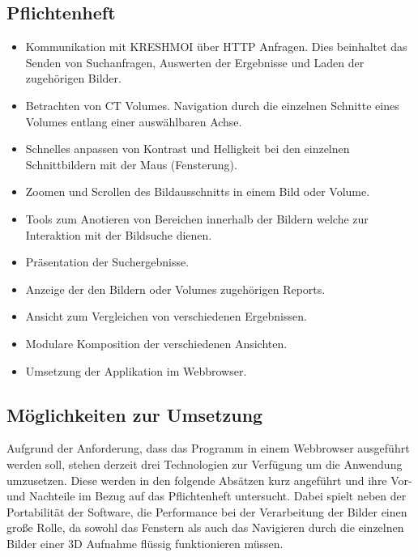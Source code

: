\subsection{Pflichtenheft}
\label{sec:Pflichtenheft}
\begin{itemize}
	\item Kommunikation mit KRESHMOI über HTTP Anfragen. Dies beinhaltet das Senden von Suchanfragen, Auswerten der Ergebnisse und Laden der zugehörigen Bilder.
	\item Betrachten von CT Volumes. Navigation durch die einzelnen Schnitte eines Volumes entlang einer auswählbaren Achse.
	\item Schnelles anpassen von Kontrast und Helligkeit bei den einzelnen Schnittbildern mit der Maus (Fensterung).
	\item Zoomen und Scrollen des Bildausschnitts in einem Bild oder Volume.
	\item Tools zum Anotieren von Bereichen innerhalb der Bildern welche zur Interaktion mit der Bildsuche dienen.
	\item Präsentation der Suchergebnisse.
	\item Anzeige der den Bildern oder Volumes zugehörigen Reports.
	\item Ansicht zum Vergleichen von verschiedenen Ergebnissen.
	\item Modulare Komposition der verschiedenen Ansichten.
	\item Umsetzung der Applikation im Webbrowser.
\end{itemize}

\subsection{Möglichkeiten zur Umsetzung}
\label{sec:Möglichkeiten zur Umsetzung}
Aufgrund der Anforderung, dass das Programm in einem Webbrowser ausgeführt werden soll, stehen derzeit drei Technologien zur Verfügung um die Anwendung umzusetzen.
Diese werden in den folgende Absätzen kurz angeführt und ihre Vor- und Nachteile im Bezug auf das Pflichtenheft untersucht.
Dabei spielt neben der Portabilität der Software, 
die Performance bei der Verarbeitung der Bilder einen große Rolle, da sowohl das Fenstern als auch das Navigieren durch die einzelnen Bilder einer 3D Aufnahme flüssig funktionieren müssen.


